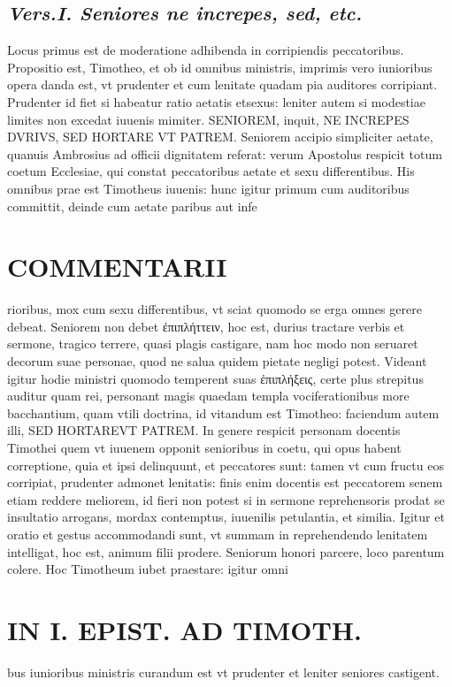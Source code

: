 \documentclass{article}
\begin{document}
\begin{pages}
\subsection*{\textit{Vers.I. Seniores ne increpes, sed, etc. }}\pstart Locus primus est de moderatione adhibenda in corripiendis peccatoribus. Propositio est, Timotheo, et ob id omnibus ministris, imprimis vero iunioribus opera danda est, vt prudenter et cum lenitate quadam pia auditores corripiant. Prudenter id fiet si habeatur ratio aetatis etsexus: leniter autem si modestiae limites non excedat iuuenis mimiter.  \pend\pstart SENIOREM, inquit, NE INCREPES DVRIVS, SED HORTARE VT PATREM. Seniorem accipio simpliciter aetate, quanuis Ambrosius ad officii dignitatem referat: verum Apostolus respicit totum coetum Ecclesiae, qui constat peccatoribus aetate et sexu differentibus. His omnibus prae est Timotheus iuuenis: hunc igitur primum cum auditoribus committit, deinde cum aetate paribus aut infe\pend
\section*{COMMENTARII }
\marginpar{[ p.118 ]}\pstart rioribus, mox cum sexu differentibus, vt sciat quomodo se erga omnes gerere debeat. Seniorem non debet ἐπιπλήττειν, hoc est, durius tractare verbis et sermone, tragico terrere, quasi plagis castigare, nam hoc modo non seruaret decorum suae personae, quod ne salua quidem pietate negligi potest. Videant igitur hodie ministri quomodo temperent suas ἐπιπλήξεις, certe plus strepitus auditur quam rei, personant magis quaedam templa vociferationibus more bacchantium, quam vtili doctrina, id vitandum est Timotheo: faciendum autem illi, SED HORTAREVT PATREM. In genere respicit personam docentis Timothei quem vt iuuenem opponit senioribus in coetu, qui opus habent correptione, quia et ipsi delinquunt, et peccatores sunt: tamen vt cum fructu eos corripiat, prudenter admonet lenitatis: finis enim docentis est peccatorem senem etiam reddere meliorem, id fieri non potest si in sermone reprehensoris prodat se insultatio arrogans, mordax contemptus, iuuenilis petulantia, et similia. Igitur et oratio et gestus accommodandi sunt, vt summam in reprehendendo lenitatem intelligat, hoc est, animum filii prodere. Seniorum honori parcere, loco parentum colere. Hoc Timotheum iubet praestare: igitur omni\pend
\section*{IN I. EPIST. AD TIMOTH. }
\marginpar{[ p.119 ]}\pstart bus iunioribus ministris curandum est vt prudenter et leniter seniores castigent.  \pend
{}
{}

\end{pages}
\end{document}
